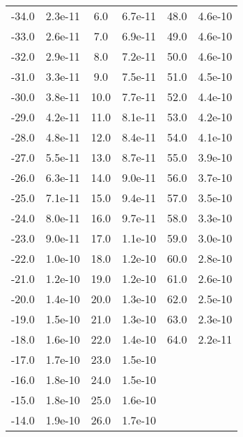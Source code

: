 \begin{table}
\begin{tabular}{cc|cc|cc}
       -34.0 &  2.3e-11 &         6.0 &  6.7e-11 &        48.0 &  4.6e-10 \\
       -33.0 &  2.6e-11 &         7.0 &  6.9e-11 &        49.0 &  4.6e-10 \\
       -32.0 &  2.9e-11 &         8.0 &  7.2e-11 &        50.0 &  4.6e-10 \\
       -31.0 &  3.3e-11 &         9.0 &  7.5e-11 &        51.0 &  4.5e-10 \\
       -30.0 &  3.8e-11 &        10.0 &  7.7e-11 &        52.0 &  4.4e-10 \\
       -29.0 &  4.2e-11 &        11.0 &  8.1e-11 &        53.0 &  4.2e-10 \\
       -28.0 &  4.8e-11 &        12.0 &  8.4e-11 &        54.0 &  4.1e-10 \\
       -27.0 &  5.5e-11 &        13.0 &  8.7e-11 &        55.0 &  3.9e-10 \\
       -26.0 &  6.3e-11 &        14.0 &  9.0e-11 &        56.0 &  3.7e-10 \\
       -25.0 &  7.1e-11 &        15.0 &  9.4e-11 &        57.0 &  3.5e-10 \\
       -24.0 &  8.0e-11 &        16.0 &  9.7e-11 &        58.0 &  3.3e-10 \\
       -23.0 &  9.0e-11 &        17.0 &  1.1e-10 &        59.0 &  3.0e-10 \\
       -22.0 &  1.0e-10 &        18.0 &  1.2e-10 &        60.0 &  2.8e-10 \\
       -21.0 &  1.2e-10 &        19.0 &  1.2e-10 &        61.0 &  2.6e-10 \\
       -20.0 &  1.4e-10 &        20.0 &  1.3e-10 &       62.0  &  2.5e-10 \\
       -19.0 &  1.5e-10 &        21.0 &  1.3e-10 &        63.0 &  2.3e-10 \\
       -18.0 &  1.6e-10 &        22.0 &  1.4e-10 &        64.0 &  2.2e-11 \\
       -17.0 &  1.7e-10 &        23.0 &  1.5e-10 &  & \\
       -16.0 &  1.8e-10 &        24.0 &  1.5e-10 &  & \\
       -15.0 &  1.8e-10 &        25.0 &  1.6e-10 &  & \\
       -14.0 &  1.9e-10 &        26.0 &  1.7e-10 &  &
\end{tabular}
\end{table}

